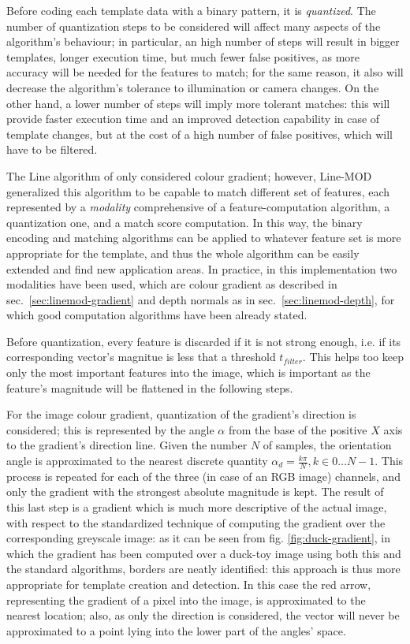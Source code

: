 Before coding each template data with a binary pattern, it is
\emph{quantized}. The number of quantization steps to be considered
will affect many aspects of the algorithm's behaviour; in particular,
an high number of steps will result in bigger templates, longer
execution time, but much fewer false positives, as more accuracy will
be needed for the features to match; for the same reason, it also will
decrease the algorithm's tolerance to illumination or camera
changes. On the other hand, a lower number of steps will imply more
tolerant matches: this will provide faster execution time and an
improved detection capability in case of template changes, but at the
cost of a high number of false positives, which will have to be filtered.

The Line algorithm of \cite{linemod-origins} only considered colour gradient; however, Line-MOD
generalized this algorithm to be capable to match different set of
features, each represented by a \emph{modality} comprehensive of a
feature-computation algorithm, a quantization one, and a match score
computation. In this way, the binary encoding and matching algorithms
can be applied to whatever feature set is more appropriate for the
template, and thus the whole algorithm can be easily extended and find
new application areas. In practice, in this implementation two
modalities have been used, which are colour gradient as described in
sec.~\ref{sec:linemod-gradient} and depth normals as in
sec.~\ref{sec:linemod-depth}, for which good computation algorithms have
been already stated.

Before quantization, every feature is discarded if it is not strong
enough, i.e. if its corresponding vector's magnitue is less that a
threshold $t_{filter}$. This helps too keep only the most important
features into the image, which is important as the feature's magnitude
will be flattened in the following steps.

For the image colour gradient, quantization of the gradient's direction is
considered; this is represented by the angle $\alpha$ from the
base of the positive $X$ axis to the gradient's direction line. Given
the number $N$ of samples, the orientation angle is approximated to
the nearest discrete quantity $\alpha_d = \frac{k\pi}{N}, k \in
{0\dots N-1}$. 
This process is repeated for each of the three (in case of an RGB
image) channels, and only the gradient with the strongest absolute
magnitude is kept. The result of this last step is a gradient which is
much more descriptive of the actual image, with respect to the
standardized technique of computing the gradient over the
corresponding greyscale image: as it can be seen from
fig. \ref{fig:duck-gradient}, in which the gradient has been computed
over a duck-toy image using both this and the standard algorithms,
borders are neatly identified: this approach is thus more appropriate for
template creation and detection. In this case the red arrow,
representing the gradient of a pixel into the image, is approximated
to the nearest location; also, as only the direction is considered,
the vector will never be approximated to a point lying into the lower
part of the angles' space.

